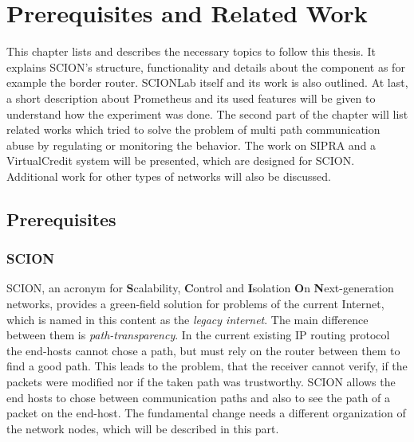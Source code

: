 \documentclass[thesis.tex]{subfiles}
\begin{document}
\chapter{Prerequisites and Related Work}  \label{chap:preqAndRel}

This chapter lists and describes the necessary topics to follow this thesis. It explains SCION's structure, functionality and details about the component as for example the border router. SCIONLab itself and its work is also outlined. At last, a short description about Prometheus and its used features will be given to understand how the experiment was done.
The second part of the chapter will list related works which tried to solve the problem of multi path communication abuse by regulating or monitoring the behavior. The work on SIPRA and a VirtualCredit system will be presented, which are designed for SCION. Additional work for other types of networks will also be discussed.

\section{Prerequisites} \label{chap:preq}

\subsection{SCION} \cite{SCIONPaper, SCIONBook}

SCION, an acronym for \textbf{S}calability, \textbf{C}ontrol and \textbf{I}solation \textbf{O}n \textbf{N}ext-generation networks, provides a green-field solution for problems of the current Internet, which is named in this content as the \textit{legacy internet}. The main difference between them is \textit{path-transparency}. In the current existing IP routing protocol the end-hosts cannot chose a path, but must rely on the router between them to find a good path. This leads to the problem, that the receiver cannot verify, if the packets were modified nor if the taken path was trustworthy. SCION allows the end hosts to chose between communication paths and also to see the path of a packet on the end-host. The fundamental change needs a different organization of the network nodes, which will be described in this part.
\end{document}
